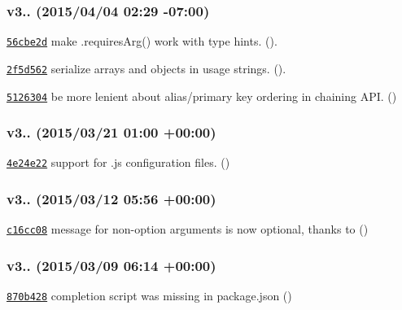 \subsubsection*{v3.. (2015/04/04 02\+:29 -\/07\+:00)}


\begin{DoxyItemize}
\item \href{https://github.com/bcoe/yargs/commit/56cbe2ddd33dc176dcbf97ba40559864a9f114e4}{\tt 56cbe2d} make .requires\+Arg() work with type hints. ().
\item \href{https://github.com/bcoe/yargs/commit/2f5d5624f736741deeedf6a664d57bc4d857bdd0}{\tt 2f5d562} serialize arrays and objects in usage strings. ().
\item \href{https://github.com/bcoe/yargs/commit/5126304dd18351fc28f10530616fdd9361e0af98}{\tt 5126304} be more lenient about alias/primary key ordering in chaining A\+PI. ()
\end{DoxyItemize}

\subsubsection*{v3.. (2015/03/21 01\+:00 +00\+:00)}


\begin{DoxyItemize}
\item \href{https://github.com/bcoe/yargs/commit/4e24e22e6a195e55ab943ede704a0231ac33b99c}{\tt 4e24e22} support for .js configuration files. ()
\end{DoxyItemize}

\subsubsection*{v3.. (2015/03/12 05\+:56 +00\+:00)}


\begin{DoxyItemize}
\item \href{https://github.com/bcoe/yargs/commit/c16cc085501155cf7fd853ccdf8584b05ab92b78}{\tt c16cc08} message for non-\/option arguments is now optional, thanks to ()
\end{DoxyItemize}

\subsubsection*{v3.. (2015/03/09 06\+:14 +00\+:00)}


\begin{DoxyItemize}
\item \href{https://github.com/bcoe/yargs/commit/870b428cf515d560926ca392555b7ad57dba9e3d}{\tt 870b428} completion script was missing in package.\+json ()
\end{DoxyItemize}

